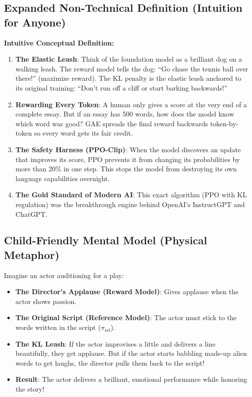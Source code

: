 \documentclass[11pt,a4paper]{article}
\theoremstyle{definition}
\begin{document}
\subsection{Expanded Non-Technical Definition (Intuition for Anyone)}
\textbf{Intuitive Conceptual Definition:}
\begin{enumerate}
    \item \textbf{The Elastic Leash}: Think of the foundation model as a brilliant dog on a walking leash. The reward model tells the dog: ``Go chase the tennis ball over there!'' (maximize reward). The KL penalty is the elastic leash anchored to its original training: ``Don't run off a cliff or start barking backwards!''
    \item \textbf{Rewarding Every Token}: A human only gives a score at the very end of a complete essay. But if an essay has 500 words, how does the model know which word was good? GAE spreads the final reward backwards token-by-token so every word gets its fair credit.
    \item \textbf{The Safety Harness (PPO-Clip)}: When the model discovers an update that improves its score, PPO prevents it from changing its probabilities by more than 20\% in one step. This stops the model from destroying its own language capabilities overnight.
    \item \textbf{The Gold Standard of Modern AI}: This exact algorithm (PPO with KL regulation) was the breakthrough engine behind OpenAI's InstructGPT and ChatGPT.
\end{enumerate}

\subsection{Child-Friendly Mental Model (Physical Metaphor)}
Imagine an actor auditioning for a play:
\begin{itemize}
    \item \textbf{The Director's Applause (Reward Model)}: Gives applause when the actor shows passion.
    \item \textbf{The Original Script (Reference Model)}: The actor must stick to the words written in the script ($\pi_{\text{ref}}$).
    \item \textbf{The KL Leash}: If the actor improvises a little and delivers a line beautifully, they get applause. But if the actor starts babbling made-up alien words to get laughs, the director pulls them back to the script!
    \item \textbf{Result}: The actor delivers a brilliant, emotional performance while honoring the story!
\end{itemize}
\end{document}
